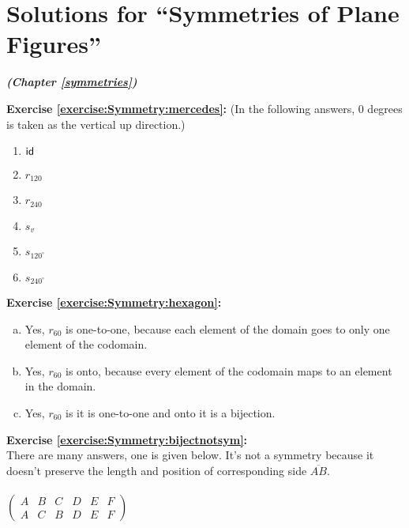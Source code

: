 \section{Solutions for  ``Symmetries of Plane Figures''}
\noindent\textbf{\textit{ (Chapter \ref{symmetries})}}\bigskip

\noindent\textbf{Exercise \ref{exercise:Symmetry:mercedes}:}
(In the following answers, 0 degrees is taken as the vertical up direction.)
\begin{multicols}{3}
\begin{enumerate}
\item
$\sf{id}$

\item
$r_{120}$

\item
$r_{240}$

\item
$s_v$

\item
$s_{120^{\circ}}$

\item
$s_{240^{\circ}}$
\end{enumerate}
\end{multicols}

\noindent\textbf{Exercise \ref{exercise:Symmetry:hexagon}:}
\begin{enumerate}[(a)]
\item
Yes, $r_{60}$ is one-to-one, because each element of the domain goes to only one element of the codomain.

\item
Yes, $r_{60}$ is onto, because every element of the codomain maps to an element in the domain.

\item
Yes, $r_{60}$ is it is one-to-one and onto it is a bijection.
\end{enumerate}

\noindent\textbf{Exercise \ref{exercise:Symmetry:bijectnotsym}:}\\
There are many answers, one is given below.  It's not a symmetry because it doesn't preserve the length and position of corresponding side $\overline{AB}$.\\
\\
$\begin{pmatrix}
A & B & C & D & E & F\\
A & C & B & D & E & F
\end{pmatrix}$\\

